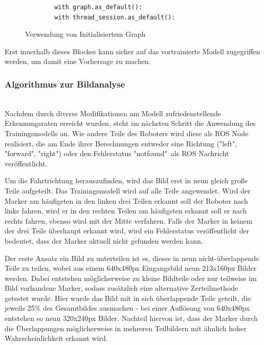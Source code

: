 \documentclass[conference]{IEEEtran}
\begin{document}
	\begin{figure}
		\centering
		\begin{verbatim}
		with graph.as_default():
		with thread_session.as_default():
		\end{verbatim}
		\label{with}
		\caption{Verwendung von Initialisiertem Graph}
	\end{figure}
		
	Erst innerhalb dieses Blockes kann sicher auf das vortrainierte Modell zugegriffen werden, um damit eine Vorhersage zu machen.
	\subsubsection{Algorithmus zur Bildanalyse }
	\noindent \\
Nachdem durch diverse Modifikationen am Modell  zufriedenstellende 
Erkennungsraten erreicht wurden, steht im nächsten Schritt die Anwendung 
des Trainingsmodells an.
Wie andere Teile des Roboters wird diese als ROS Node realisiert, die am Ende ihrer Berechnungen entweder eine Richtung ("left", "forward", "right") oder den Fehlerstatus "notfound"\ als ROS Nachricht veröffentlicht.

Um die Fahrtrichtung herauszufinden, wird das Bild erst in neun gleich 
gro{\ss}e Teile aufgeteilt. Das Trainingsmodell  wird auf alle Teile 
angewendet.
Wird der Marker am häufigsten in den linken drei Teilen erkannt soll der 
Roboter nach links fahren, wird er in den rechten Teilen am häufigsten 
erkannt soll er nach rechts fahren, ebenso wird mit der Mitte verfahren.
Falls der Marker in keinem der drei Teile überhaupt erkannt wird, wird ein Fehlerstatus veröffentlicht der bedeutet, dass der Marker aktuell nicht gefunden werden kann.

Der erste Ansatz ein Bild zu unterteilen ist es, dieses in neun nicht-überlappende Teile zu teilen, wobei aus einem 640x480px Eingangsbild neun 213x160px Bilder werden. 
Dabei entstehen möglicherweise zu kleine Bildteile oder nur teilweise im 
Bild vorhandene Marker, sodass zusätzlich eine alternative Zerteilmethode 
getestet wurde. 
Hier wurde das Bild mit in sich überlappende Teile geteilt, die jeweils 25\% des Gesamtbildes ausmachen - bei einer Auflösung von 640x480px entstehen so neun 320x240px Bilder.
Nachteil hiervon ist, dass der Marker durch die Überlappungen möglicherweise in mehreren Teilbildern mit ähnlich hoher Wahrscheinlichkeit erkannt wird.
\end{document}
